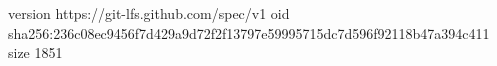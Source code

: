 version https://git-lfs.github.com/spec/v1
oid sha256:236c08ec9456f7d429a9d72f2f13797e59995715dc7d596f92118b47a394c411
size 1851
